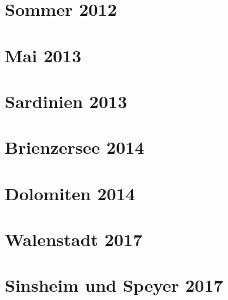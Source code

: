 \documentclass[11pt,nswissgerman]{article}
\begin{document}
\section{Sommer 2012}

\newpage
\section{Mai 2013}

\newpage
\section{Sardinien 2013}

\newpage
\section{Brienzersee 2014}

\newpage
\section{Dolomiten 2014}

\newpage
\section{Walenstadt 2017}

\newpage
\section{Sinsheim und Speyer 2017}

\newpage
\listoffigures
\newpage
\appendix
\end{document}
